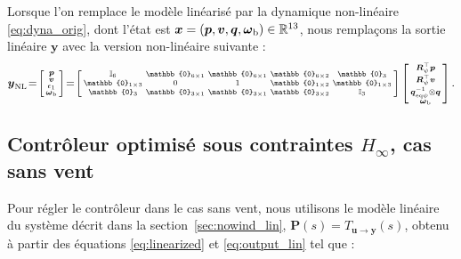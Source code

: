 Lorsque l'on remplace le modèle linéarisé par la dynamique non-linéaire \eqref{eq:dyna_orig}, dont l'état est $\boldsymbol{x} = (\boldsymbol{p}, \boldsymbol{v}, \boldsymbol{q},\boldsymbol{\omega}_{\text{b}}) \in {\mathbb R}^{13} $, nous remplaçons la sortie linéaire $\boldsymbol{y}$ avec la version non-linéaire suivante :
\begin{align}
\label{eq:output}
    \boldsymbol{y}_{\text{NL}} \!=\! \smallmat{\boldsymbol{p}\\
     \boldsymbol{v}\\
     \epsilon_{1}\\
     \boldsymbol{\omega}_{\text{b}}} \!=\! \left[ \begin{smallmatrix} \mathbb{I}_{6} & \mathbb{0}_{6\times 1} & \mathbb{0}_{6\times 1} & \mathbb{0}_{6\times 2} & \mathbb{0}_{3}\\
     \mathbb{0}_{1\times 3} & 0 & 1 & \mathbb{0}_{1\times 2} & \mathbb{0}_{1 \times 3} \\
         \mathbb{0}_{3} & \mathbb{0}_{3\times 1} & \mathbb{0}_{3\times 1} & \mathbb{0}_{3\times 2} &   \mathbb{I}_{3}
         \end{smallmatrix} \right]
         \smallmat{\boldsymbol{R}^\top_{\psi}\boldsymbol{p} \\ \boldsymbol{R}^\top_{\psi}\boldsymbol{v} \\
\boldsymbol{q}_{\mathrm{eq}\psi}^{-1} \otimes \boldsymbol{q} \\
         \boldsymbol{\omega}_{\text{b}}  }.
\end{align}




\subsection{Contrôleur optimisé sous contraintes $H_{\infty}$, cas sans vent}
\label{sec:zerowind}

Pour régler le contrôleur dans le cas sans vent, nous utilisons le modèle linéaire du système décrit dans la section~\ref{sec:nowind_lin}, $\boldsymbol{P}(s) = T_{\boldsymbol{u} \rightarrow \boldsymbol{y}}(s)$, obtenu à partir des équations \eqref{eq:linearized} et \eqref{eq:output_lin} tel que :


